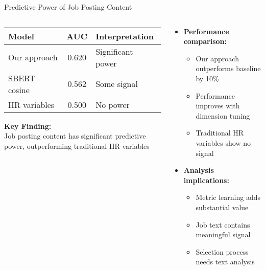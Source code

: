 \documentclass{beamer}
\begin{document}
\begin{frame}{Predictive Power of Job Posting Content}
\begin{columns}
\begin{column}{0.48\textwidth}
\begin{table}
\centering
\begin{tabular}{l c l}
\toprule
\textbf{Model} & \textbf{AUC} & \textbf{Interpretation} \\
\midrule
Our approach & 0.620 & Significant power \\
SBERT cosine & 0.562 & Some signal \\
HR variables & 0.500 & No power \\
\bottomrule
\end{tabular}
\end{table}

\begin{tcolorbox}[colback=boxbackground,colframe=boxframe,sharp corners]
\textbf{Key Finding:}\\
Job posting content has significant predictive power, outperforming traditional HR variables
\end{tcolorbox}
\end{column}
\begin{column}{0.48\textwidth}
\begin{itemize}
    \item \textbf{Performance comparison:}
    \begin{itemize}
        \item Our approach outperforms baseline by 10\%
        \item Performance improves with dimension tuning
        \item Traditional HR variables show no signal
    \end{itemize}
    \item \textbf{Analysis implications:}
    \begin{itemize}
        \item Metric learning adds substantial value
        \item Job text contains meaningful signal
        \item Selection process needs text analysis
    \end{itemize}
\end{itemize}
\end{column}
\end{columns}
\end{frame}
\end{document}
